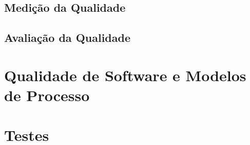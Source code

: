 \documentclass[
	12pt,				%
	openright,			%
	oneside,			%
	a4paper,			%
	english,			%
	brazil,				%
	]{abntex2}
\begin{document}
\section{Medição da Qualidade}

\section{Avaliação da Qualidade}


\chapter{Qualidade de Software e Modelos de Processo}




\chapter{Testes}

\end{document}
